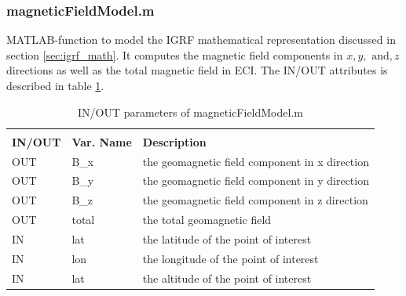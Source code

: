 \subsubsection{magneticFieldModel.m}
MATLAB-function to model the IGRF mathematical representation discussed in section \ref{sec:igrf_math}. It computes the magnetic field components in $x, y, \text{ and}, z$ directions as well as the total magnetic field in ECI. The IN/OUT attributes is described in table \ref{tab:igrf}.
\begin{table}[H]
\centering
\caption{IN/OUT parameters of magneticFieldModel.m}
\label{tab:igrf}
\begin{tabular}{lll}
\rowcolor[HTML]{000000} 
\multicolumn{3}{l}{\cellcolor[HTML]{000000}{\color[HTML]{FFFFFF} magneticFieldModel.m: Modeling the geo-magnetic field}}                                                \\
\rowcolor[HTML]{000000} 
{\color[HTML]{FFFFFF} \textbf{IN/OUT}} & {\color[HTML]{FFFFFF} \textbf{Var. Name}} & {\color[HTML]{FFFFFF} \textbf{Description}} \\
OUT & B\_x & the geomagnetic field component in x direction\\
OUT & B\_y & the geomagnetic field component in y direction\\
OUT & B\_z & the geomagnetic field component in z direction\\
OUT & total & the total geomagnetic field\\
IN & lat & the latitude of the point of interest \\
IN & lon & the longitude of the point of interest \\
IN & lat & the altitude of the point of interest
\end{tabular}%
\end{table}



